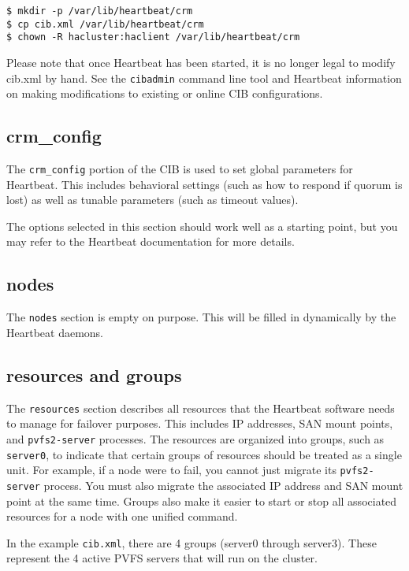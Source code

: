 \documentclass[11pt]{article}
\begin{document}
\begin{verbatim}
$ mkdir -p /var/lib/heartbeat/crm
$ cp cib.xml /var/lib/heartbeat/crm
$ chown -R hacluster:haclient /var/lib/heartbeat/crm
\end{verbatim}

Please note that once Heartbeat has been started, it is no longer
legal to modify cib.xml by hand.  See the \texttt{cibadmin} command line
tool and Heartbeat information on making modifications to
existing or online CIB configurations.

\subsection{crm\_config}

The \texttt{crm\_config} portion of the CIB is used to set global
parameters for Heartbeat.  This includes behavioral settings
(such as how to respond if quorum is lost) as well as tunable parameters
(such as timeout values).

The options selected in this section should work well as a starting
point, but you may refer to the Heartbeat documentation for more
details.

\subsection{nodes}

The \texttt{nodes} section is empty on purpose.  This will be filled in
dynamically by the Heartbeat daemons.

\subsection{resources and groups}

The \texttt{resources} section describes all resources that the
Heartbeat software needs to manage for failover purposes.  This includes
IP addresses, SAN mount points, and \texttt{pvfs2-server} processes.  The
resources are organized into groups, such as \texttt{server0}, to
indicate that certain groups of resources should be treated as a single
unit.  For example, if a node were to fail, you cannot just migrate its
\texttt{pvfs2-server} process.  You must also migrate the associated IP address
and SAN mount point at the same time.  Groups also make it easier to
start or stop all associated resources for a node with one unified command.

In the example \texttt{cib.xml}, there are 4 groups (server0 through
server3).  These represent the 4 active PVFS servers that will run on
the cluster.
\end{document}
